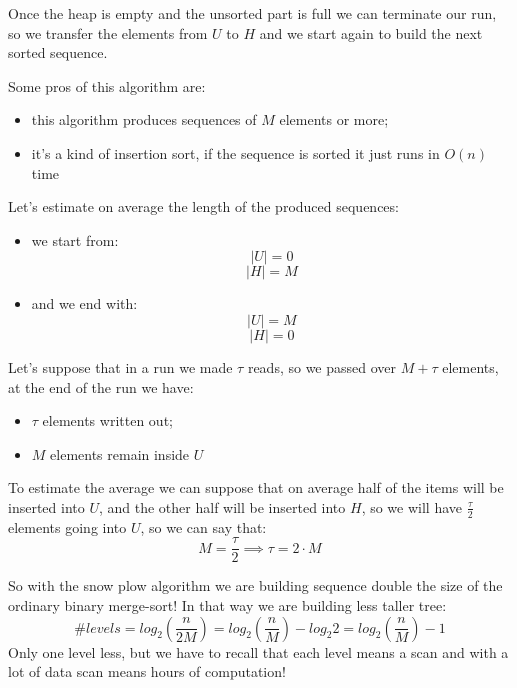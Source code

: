 Once the heap is empty and the unsorted part is full we can terminate our run, so we transfer the elements from $U$ to $H$ and we start again to build the next sorted sequence.

Some pros of this algorithm are:
\begin{itemize}
    \item this algorithm produces sequences of $M$ elements or more;
    \item it's a kind of insertion sort, if the sequence is sorted it just runs in $O(n)$ time
\end{itemize}

Let's estimate on average the length of the produced sequences:
\begin{itemize}
    \item we start from:
        $$ |U| = 0 $$
        $$ |H| = M $$
    \item and we end with:
        $$ |U| = M $$
        $$ |H| = 0 $$
\end{itemize}
Let's suppose that in a run we made $\tau$ reads, so we passed over $M + \tau$ elements, at the end of the run we have:
\begin{itemize}
    \item $\tau$ elements written out;
    \item $M$ elements remain inside $U$
\end{itemize}

To estimate the average we can suppose that on average half of the items will be inserted into $U$, and the other half will be inserted into $H$, so we will have $\frac{\tau}{2}$ elements going into $U$, so we can say that:
$$
    M = \frac{\tau}{2} \implies \tau = 2 \cdot M
$$

So with the snow plow algorithm we are building sequence double the size of the ordinary binary merge-sort!
In that way we are building less taller tree:
$$
    \#levels = log_2 \left( \frac{n}{2M} \right) = log_2 \left( \frac{n}{M} \right) - log_2 2 = log_2 \left( \frac{n}{M} \right) - 1
$$
Only one level less, but we have to recall that each level means a scan and with a lot of data scan means hours of computation!

